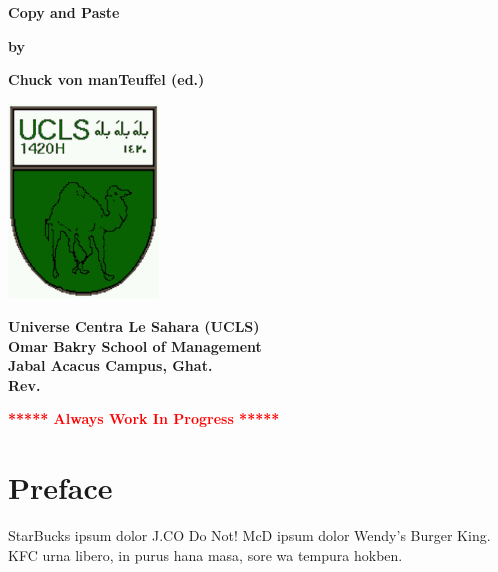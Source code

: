 \documentclass[12pt]{book}
\newcommand{\pengarangs}{%
    Chuck von manTeuffel (ed.)
}
\newcommand{\judul}{%
Copy and Paste
}
\begin{document}
\begin{titlepage}
    \begin{center}    

    \vspace*{15mm}
    \textbf{\Large \judul}

    \vspace*{30mm}       
    \textbf{by}

    \vspace*{15mm}    
    \textbf{\Large \pengarangs}

    \vspace*{4.0cm}

    \begin{center}
        \includegraphics[width=40mm]{ucls-coat}
    \end{center}

    \textbf{
       Universe Centra Le Sahara (UCLS)\\[10pt]
       Omar Bakry School of Management\\[10pt]
       Jabal Acacus Campus, Ghat. \\[10pt]
       Rev. \rev%
    }

    \vspace*{15mm}    
    \textbf{\LARGE \textcolor{red}{***** Always Work In Progress *****}}

    \end{center}

\end{titlepage}


\tableofcontents

\newpage

\chapter*{Preface}

StarBucks ipsum dolor J.CO Do Not!
McD ipsum dolor Wendy’s Burger King.
KFC urna libero, in purus hana masa, sore wa tempura hokben.
\\[1pt]
\end{document}
